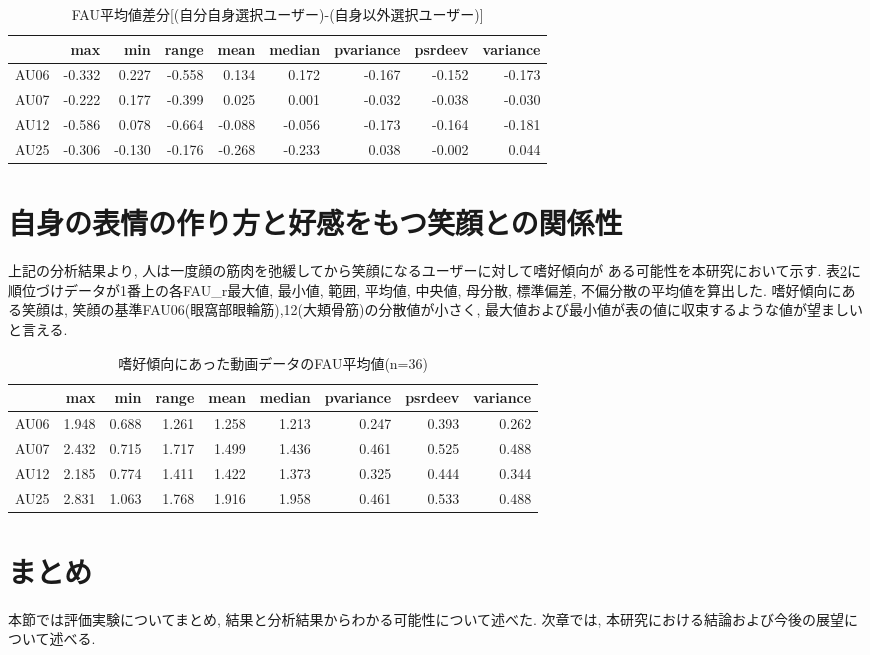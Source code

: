 \begin{table}[htb]
  \caption{FAU平均値差分[(自分自身選択ユーザー)-(自身以外選択ユーザー)]}
  \label{tb:mean_differences}
  \begin{center}
  \begin{tabular}{|l||r|r|r|r|r|r|r|r|} \hline
    &max	&min	&range	&mean	&median	&pvariance	&psrdeev	&variance \\ \hline \hline
  AU06	&-0.332 	&0.227 	&-0.558 	&0.134 	&0.172 	&-0.167 	&-0.152 	&-0.173   \\ \hline
  AU07	&-0.222 	&0.177 	&-0.399 	&0.025 	&0.001 	&-0.032 	&-0.038 	&-0.030   \\ \hline
  AU12	&-0.586 	&0.078 	&-0.664 	&-0.088 	&-0.056 	&-0.173 	&-0.164 	&-0.181   \\ \hline
  AU25	&-0.306 	&-0.130 	&-0.176 	&-0.268 	&-0.233 	&0.038 	&-0.002 	&0.044   \\ \hline
  \end{tabular}
  \end{center}
\end{table}


\section{自身の表情の作り方と好感をもつ笑顔との関係性}
上記の分析結果より, 人は一度顔の筋肉を弛緩してから笑顔になるユーザーに対して嗜好傾向が
ある可能性を本研究において示す.
表\ref{tb:prefer_fau}に順位づけデータが1番上の各FAU\_r最大値, 最小値, 範囲, 平均値, 中央値,
母分散, 標準偏差, 不偏分散の平均値を算出した.
嗜好傾向にある笑顔は, 笑顔の基準FAU06(眼窩部眼輪筋),12(大頬骨筋)の分散値が小さく,
最大値および最小値が表の値に収束するような値が望ましいと言える.

\begin{table}[htb]
  \caption{嗜好傾向にあった動画データのFAU平均値(n=36)}
  \label{tb:prefer_fau}
  \begin{center}
  \begin{tabular}{|l||r|r|r|r|r|r|r|r|} \hline
    &max	&min	&range	&mean	&median	&pvariance	&psrdeev	&variance \\ \hline \hline
  AU06	&1.948	&0.688	&1.261	&1.258	&1.213	&0.247	&0.393	&0.262   \\ \hline
  AU07	&2.432	&0.715	&1.717	&1.499	&1.436	&0.461	&0.525	&0.488   \\ \hline
  AU12	&2.185	&0.774	&1.411	&1.422	&1.373	&0.325	&0.444	&0.344   \\ \hline
  AU25	&2.831	&1.063	&1.768	&1.916	&1.958	&0.461	&0.533	&0.488   \\ \hline
  \end{tabular}
  \end{center}
\end{table}

\section{まとめ}
本節では評価実験についてまとめ, 結果と分析結果からわかる可能性について述べた.
次章では, 本研究における結論および今後の展望について述べる.
